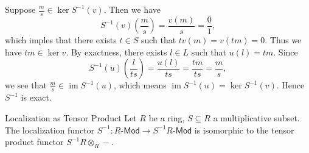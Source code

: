 \begin{prf}
    Suppose $\frac{m}{s}\in \ker S^{-1}(v) $. Then we have
    \[
        S^{-1}(v)\left(\frac{m}{s}\right)=\frac{v(m)}{s}=\frac{0}{1},
    \]
    which imples that there exists $t\in S$ such that $tv(m)=v(tm)=0$. Thus we have $tm\in \ker v$. By exactness, there exists $l\in L$ such that $u(l)=tm$. Since 
    \[
        S^{-1}(u)\left(\frac{l}{ts}\right)=\frac{u(l)}{ts}=\frac{tm}{ts}=\frac{m}{s},
    \]
    we see that $\frac{m}{s}\in \operatorname{im}S^{-1}(u)$, which means $\operatorname{im}S^{-1}(u)=\ker S^{-1}(v)$. Hence $S^{-1}$ is exact.
\end{prf}

\begin{proposition}{Localization as Tensor Product}{}
    Let \(R\) be a ring, \(S \subseteq R\) a multiplicative subset. The localization functor $S^{-1}:R\text{-}\mathsf{Mod}\to S^{-1}R\text{-}\mathsf{Mod}$ is isomorphic to the tensor product functor $ S^{-1}R \otimes_R -$.
\end{proposition}
